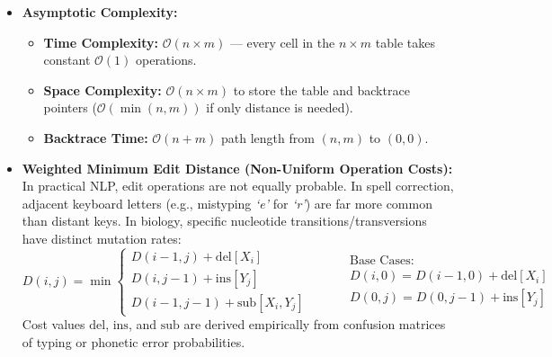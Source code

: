 \documentclass[10pt,a4paper]{article}
\begin{document}
\vspace{-2pt}
\par\vspace{1pt}
\begin{itemize}[leftmargin=12pt, itemsep=1pt, parsep=0pt, topsep=0.5pt]
    \item \textbf{Asymptotic Complexity:}
    \begin{itemize}[leftmargin=10pt, itemsep=0.5pt]
        \item \textbf{Time Complexity:} $\mathcal{O}(n \times m)$ --- every cell in the $n \times m$ table takes constant $\mathcal{O}(1)$ operations.
        \item \textbf{Space Complexity:} $\mathcal{O}(n \times m)$ to store the table and backtrace pointers ($\mathcal{O}(\min(n, m))$ if only distance is needed).
        \item \textbf{Backtrace Time:} $\mathcal{O}(n + m)$ path length from $(n, m)$ to $(0, 0)$.
    \end{itemize}
    \item \textbf{Weighted Minimum Edit Distance (Non-Uniform Operation Costs):}
    \newline In practical NLP, edit operations are not equally probable. In spell correction, adjacent keyboard letters (e.g., mistyping \textit{`e'} for \textit{`r'}) are far more common than distant keys. In biology, specific nucleotide transitions/transversions have distinct mutation rates:
    \[
    D(i, j) = \min \begin{cases}
    D(i-1, j) + \text{del}[X_i] \\
    D(i, j-1) + \text{ins}[Y_j] \\
    D(i-1, j-1) + \text{sub}[X_i, Y_j]
    \end{cases}
    \qquad
    \begin{aligned}
    & \text{Base Cases:} \\
    & D(i, 0) = D(i-1, 0) + \text{del}[X_i] \\
    & D(0, j) = D(0, j-1) + \text{ins}[Y_j]
    \end{aligned}
    \]
    Cost values $\text{del}$, $\text{ins}$, and $\text{sub}$ are derived empirically from confusion matrices of typing or phonetic error probabilities.
\end{itemize}
\end{document}
